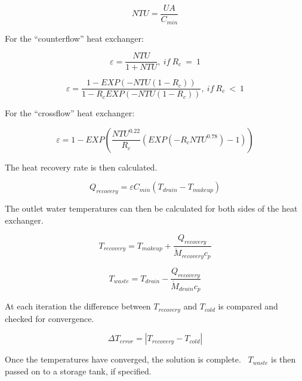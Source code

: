 \begin{equation}
NTU = \frac{{UA}}{{{C_{min}}}}
\end{equation}

For the ``counterflow'' heat exchanger:

\begin{equation}
\varepsilon = \frac{{NTU}}{{1 + NTU}},~if~{R_c}~=~1
\end{equation}

\begin{equation}
\varepsilon = \frac{{1 - EXP\left( { - NTU\left( {1 - {R_c}} \right)} \right)}}{{1 - {R_c}EXP\left( { - NTU\left( {1 - {R_c}} \right)} \right)}},~if~{R_c}~<~1
\end{equation}

For the ``crossflow'' heat exchanger:

\begin{equation}
\varepsilon  = 1 - EXP\left( {\frac{{NT{U^{0.22}}}}{{{R_c}}}\left( {EXP\left( { - {R_c}NT{U^{0.78}}} \right) - 1} \right)} \right)
\end{equation}

The heat recovery rate is then calculated.

\begin{equation}
{Q_{recovery}} = \varepsilon {C_{min}}\left( {{T_{drain}} - {T_{makeup}}} \right)
\end{equation}

The outlet water temperatures can then be calculated for both sides of the heat exchanger.

\begin{equation}
{T_{recovery}} = {T_{makeup}} + \frac{{{Q_{recovery}}}}{{{{\dot M}_{recovery}}{c_p}}}
\end{equation}

\begin{equation}
{T_{waste}} = {T_{drain}} - \frac{{{Q_{recovery}}}}{{{{\dot M}_{drain}}{c_p}}}
\end{equation}

At each iteration the difference between \({T_{recovery}}\) and \({T_{cold}}\) is compared and checked for convergence.

\begin{equation}
\Delta {T_{error}} = \left| {{T_{recovery}} - {T_{cold}}} \right|
\end{equation}

Once the temperatures have converged, the solution is complete.~ \({T_{waste}}\) is then passed on to a storage tank, if specified.
